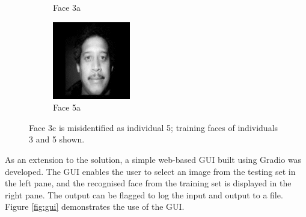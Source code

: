 \begin{figure}[ht]
\begin{subfigure}[b]{0.2\textwidth}
    \caption{Face 3a}
  \end{subfigure}
  \hspace{3em}
  \begin{subfigure}[b]{0.2\textwidth}
    \centering
    \includegraphics[width=\textwidth]{images/q3_face_5a.png}
    \caption{Face 5a}
  \end{subfigure}
  \caption{Face 3c is misidentified as individual 5; training faces of individuals 3 and 5 shown.}
  \label{fig:misidentification}
\end{figure}

As an extension to the solution, a simple web-based GUI built using Gradio \cite{gradio_2023} was developed. The GUI enables the user to select an image from the testing set in the left pane, and the recognised face from the training set is displayed in the right pane. The output can be flagged to log the input and output to a file. Figure \ref{fig:gui} demonstrates the use of the GUI.

